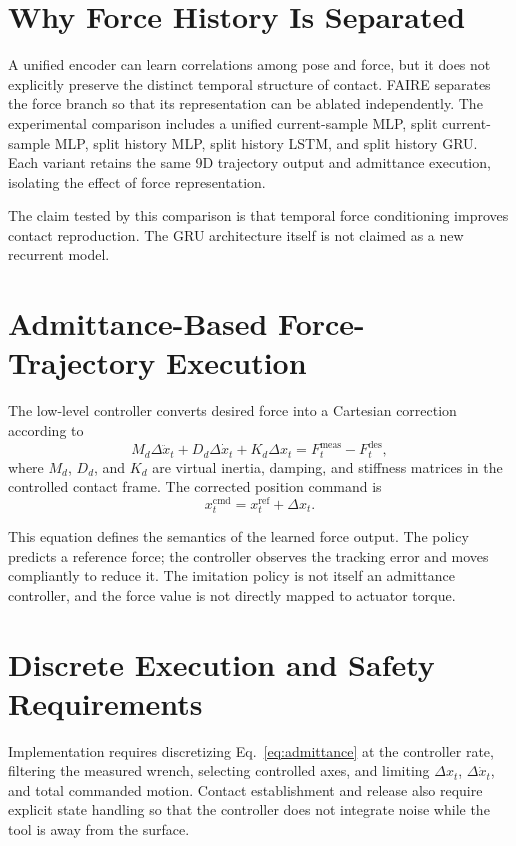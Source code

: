 \section{Why Force History Is Separated}
A unified encoder can learn correlations among pose and force, but it does not explicitly preserve the distinct temporal structure of contact. FAIRE separates the force branch so that its representation can be ablated independently. The experimental comparison includes a unified current-sample MLP, split current-sample MLP, split history MLP, split history LSTM, and split history GRU. Each variant retains the same 9D trajectory output and admittance execution, isolating the effect of force representation.

The claim tested by this comparison is that temporal force conditioning improves contact reproduction. The GRU architecture itself is not claimed as a new recurrent model.

\section{Admittance-Based Force-Trajectory Execution}
\label{sec:admittance_execution}
The low-level controller converts desired force into a Cartesian correction according to
\begin{equation}
  M_d\Delta\ddot{x}_t+
  D_d\Delta\dot{x}_t+
  K_d\Delta x_t
  =
  F_t^{\mathrm{meas}}-F_t^{\mathrm{des}},
  \label{eq:admittance}
\end{equation}
where \(M_d\), \(D_d\), and \(K_d\) are virtual inertia, damping, and stiffness matrices in the controlled contact frame. The corrected position command is
\begin{equation}
  x_t^{\mathrm{cmd}}=x_t^{\mathrm{ref}}+\Delta x_t.
  \label{eq:position_command}
\end{equation}

This equation defines the semantics of the learned force output. The policy predicts a reference force; the controller observes the tracking error and moves compliantly to reduce it. The imitation policy is not itself an admittance controller, and the force value is not directly mapped to actuator torque.

\section{Discrete Execution and Safety Requirements}
Implementation requires discretizing Eq.~\eqref{eq:admittance} at the controller rate, filtering the measured wrench, selecting controlled axes, and limiting \(\Delta x_t\), \(\Delta\dot{x}_t\), and total commanded motion. Contact establishment and release also require explicit state handling so that the controller does not integrate noise while the tool is away from the surface.


